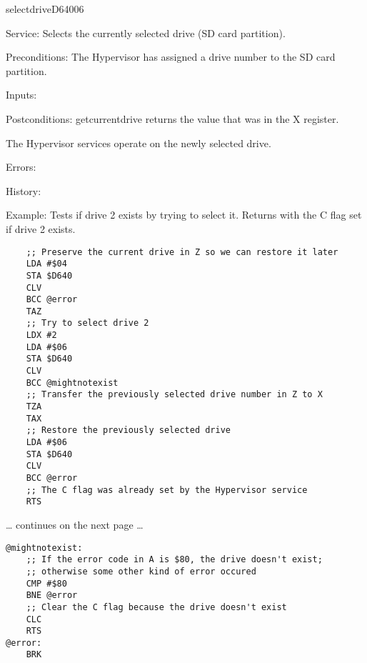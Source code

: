 \newpage
\begin{hyppotrap}{selectdrive}{D640}{06}
\item [Service:]
  Selects the currently selected drive (SD card partition).
\item [Preconditions:]
  The Hypervisor has assigned a drive number to the SD card partition.
\item [Inputs:]
\item [Postconditions:]
  getcurrentdrive returns the value that was in the X register.

  The Hypervisor services operate on the newly selected drive.
\item [Errors:]
\item [History:]
\item [Example:]
  Tests if drive 2 exists by trying to select it. Returns with the C flag set if
  drive 2 exists.
\begin{tcolorbox}[colback=black,coltext=white]
\verbatimfont{\codefont}
\begin{verbatim}
    ;; Preserve the current drive in Z so we can restore it later
    LDA #$04
    STA $D640
    CLV
    BCC @error
    TAZ
    ;; Try to select drive 2
    LDX #2
    LDA #$06
    STA $D640
    CLV
    BCC @mightnotexist
    ;; Transfer the previously selected drive number in Z to X
    TZA
    TAX
    ;; Restore the previously selected drive
    LDA #$06
    STA $D640
    CLV
    BCC @error
    ;; The C flag was already set by the Hypervisor service
    RTS
\end{verbatim}
\end{tcolorbox}
\ldots{} continues on the next page \ldots
\begin{tcolorbox}[colback=black,coltext=white]
\verbatimfont{\codefont}
\begin{verbatim}
@mightnotexist:
    ;; If the error code in A is $80, the drive doesn't exist;
    ;; otherwise some other kind of error occured
    CMP #$80
    BNE @error
    ;; Clear the C flag because the drive doesn't exist
    CLC
    RTS
@error:
    BRK
\end{verbatim}
\end{tcolorbox}
\end{hyppotrap}



